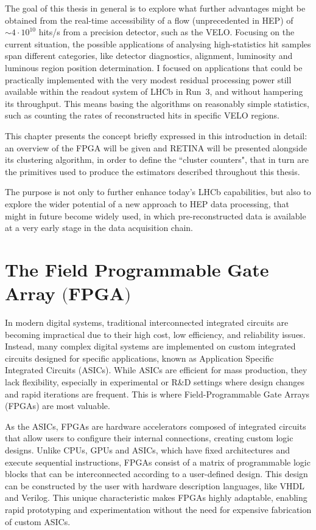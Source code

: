 The goal of this thesis in general is to explore what further advantages might be obtained from the real-time accessibility of a flow (unprecedented in HEP) of $\sim4\cdot 10^{10}$ hits/s from a precision detector, such as the VELO. Focusing on the current situation, the possible applications of analysing high-statistics hit samples span different categories, like detector diagnostics, alignment, luminosity and luminous region position determination. 
I focused on applications that could be practically implemented with the very modest residual processing power still available within the readout system of LHCb in Run~3, and without hampering its throughput. This means basing the algorithms on reasonably simple statistics, such as counting the rates of reconstructed hits in specific VELO regions.

This chapter presents the concept briefly expressed in this introduction in detail: an overview of the FPGA will be given and RETINA will be presented alongside its clustering algorithm, in order to define the ``cluster counters", that in turn are the primitives used to produce the estimators described throughout this thesis.

The purpose is not only to further enhance today's LHCb capabilities, but also to explore the wider potential of a new approach to HEP data processing, that might in future become widely used, in which pre-reconstructed data is available at a very early stage in the data acquisition chain.




\section[The Field Programmable Gate Array]{The Field Programmable Gate Array $\bigl($FPGA$\bigr)$}\label{sec:FPGA}

In modern digital systems, traditional interconnected integrated circuits are becoming impractical due to their high cost, low efficiency, and reliability issues. Instead, many complex digital systems are implemented on custom integrated circuits designed for specific applications, known as Application Specific Integrated Circuits (ASICs). While ASICs are efficient for mass production, they lack flexibility, especially in experimental or R\&D settings where design changes and rapid iterations are frequent. This is where Field-Programmable Gate Arrays (FPGAs) are most valuable.

As the ASICs, FPGAs are hardware accelerators composed of integrated circuits that allow users to configure their internal connections, creating custom logic designs. Unlike CPUs, GPUs and ASICs, which have fixed architectures and execute sequential instructions, FPGAs consist of a matrix of programmable logic blocks that can be interconnected according to a user-defined design. This design can be constructed by the user with hardware description languages, like VHDL and Verilog. This unique characteristic makes FPGAs highly adaptable, enabling rapid prototyping and experimentation without the need for expensive fabrication of custom ASICs.

